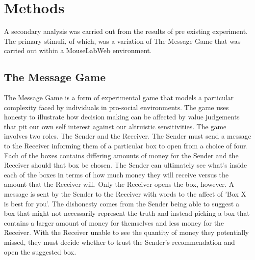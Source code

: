 \documentclass[man, floatsintext]{apa7}
\begin{document}
\section{Methods}


%
%
%

A secondary analysis was carried out from the results of pre existing experiment. The primary stimuli, of which, was a variation of The Message Game that was carried out within a MouseLabWeb environment. 

\subsection{The Message Game}

The Message Game is a form of experimental game that models a particular complexity faced by individuals in pro-social environments. The game uses honesty to illustrate how decision making can be affected by value judgements that pit our own self interest against our altruistic sensitivities. 
The game involves two roles. The Sender and the Receiver. The Sender must send a message to the Receiver informing them of a particular box to open from a choice of four. Each of the boxes contains differing amounts of money for the Sender and the Receiver should that box be chosen. The Sender can ultimately see what's inside each of the boxes in terms of how much money they will receive versus the amount that the Receiver will. Only the Receiver opens the box, however. A message is sent by the Sender to the Receiver with words to the affect of 'Box X is best for you'. The dishonesty comes from the Sender being able to suggest a box that might not necessarily represent the truth and instead picking a box that contains a larger amount of money for themselves and less money for the Receiver. With the Receiver unable to see the quantity of money they potentially missed, they must decide whether to trust the Sender's recommendation and open the suggested box.
\end{document}
